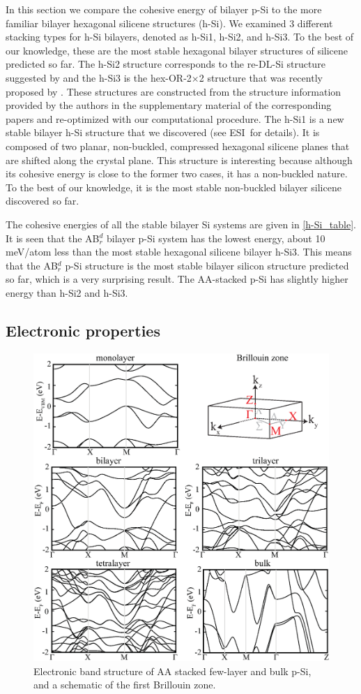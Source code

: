 In this section we compare the cohesive energy of bilayer p-Si to the more familiar bilayer hexagonal silicene structures (h-Si).  We examined 3 different stacking types for h-Si bilayers, denoted as h-Si1, h-Si2, and h-Si3. To the best of our knowledge, these are the most stable hexagonal bilayer structures of silicene predicted so far. The h-Si2 structure corresponds to the re-DL-Si structure suggested by \citet{Morishita2011} and the h-Si3 is the hex-OR-2$\times$2 structure that was recently proposed by \citet{Sakai2015}. These structures are constructed from the structure information provided by the authors in the supplementary material of the corresponding papers and re-optimized with our computational procedure. The h-Si1 is a new stable bilayer h-Si structure that we discovered (see ESI\dag~for details). It is composed of two planar, non-buckled, compressed hexagonal silicene planes that are shifted along the crystal plane. This structure is interesting because although its cohesive energy is close to the former two cases, it has a non-buckled nature. To the best of our knowledge, it is the most stable non-buckled bilayer silicene discovered so far. 

The cohesive energies of all the stable bilayer Si systems are given in \autoref{h-Si_table}. It is seen that the AB$_r^d$ bilayer p-Si system has the lowest energy, about 10 meV/atom less than the most stable hexagonal silicene bilayer h-Si3.  This means that the AB$_r^d$ p-Si structure is the most stable bilayer silicon structure predicted so far, which is a very surprising result. The AA-stacked p-Si has slightly higher energy than h-Si2 and h-Si3.

\subsection{Electronic properties}\label{elec}

\begin{figure}[htbp]
\centering
\includegraphics[width=0.8\linewidth]{ps_AA_bands.eps}%
\caption{Electronic band structure of AA stacked few-layer and bulk p-Si, and a schematic of the first Brillouin zone. \label{fig:AA_bands}}
\end{figure}

